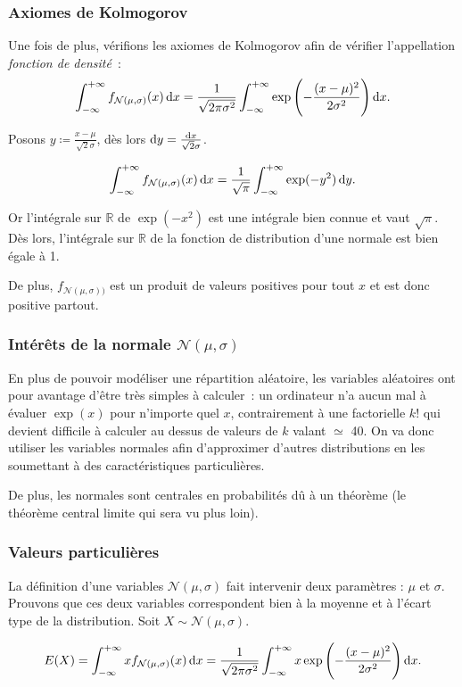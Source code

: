\documentclass{article}
\newcommand{\Nms}{{\mathcal N(\mu, \sigma)}}
\begin{document}
		\subsubsection{Axiomes de Kolmogorov}
			Une fois de plus, vérifions les axiomes de Kolmogorov afin de vérifier l'appellation \textit{fonction de densité}~:
			\[\int_{-\infty}^{+\infty}f_{\Nms}(x)\dif x = \frac 1{\sqrt {2\pi\sigma^2}}\int_{-\infty}^{+\infty}\exp\left(-\frac {(x-\mu)^2}{2\sigma^2}\right)\dif x.\]

			Posons $y \coloneqq\frac {x-\mu}{\sqrt 2\sigma}$, dès lors $\dif y = \frac {\dif x}{\sqrt 2 \sigma}$.

			\[\int_{-\infty}^{+\infty}f_{\Nms}(x)\dif x = \frac 1{\sqrt \pi}\int_{-\infty}^{+\infty}\exp(-y^2)\dif y.\]

			Or l'intégrale sur $\mathbb R$ de $\exp(-x^2)$ est une intégrale bien connue et vaut $\sqrt \pi$. Dès lors, l'intégrale sur $\mathbb R$ de la fonction de
			distribution d'une normale est bien égale à 1.

			De plus, $f_{\Nms)}$ est un produit de valeurs positives pour tout $x$ et est donc positive partout.

		\subsubsection{Intérêts de la normale $\Nms$}
			En plus de pouvoir modéliser une répartition aléatoire, les variables aléatoires ont pour avantage d'être très simples à calculer~: un ordinateur n'a aucun
			mal à évaluer $\exp(x)$ pour n'importe quel $x$, contrairement à une factorielle $k!$ qui devient difficile à calculer au dessus de valeurs de $k$ valant
			$\simeq$ 40. On va donc utiliser les variables normales afin d'approximer d'autres distributions en les soumettant à des caractéristiques particulières.

			De plus, les normales sont centrales en probabilités dû à un théorème (le théorème central limite qui sera vu plus loin).

		\subsubsection{Valeurs particulières}
			La définition d'une variables $\Nms$ fait intervenir deux paramètres : $\mu$ et $\sigma$. Prouvons que ces deux variables correspondent bien à la moyenne et
			à l'écart type de la distribution. Soit $X \sim \Nms$.

			\[E(X) = \int_{-\infty}^{+\infty}xf_{\Nms}(x)\dif x
				= \frac 1{\sqrt {2\pi\sigma^2}}\int_{-\infty}^{+\infty}x\exp\left(-\frac {(x-\mu)^2}{2\sigma^2}\right)\dif x.\]
\end{document}
